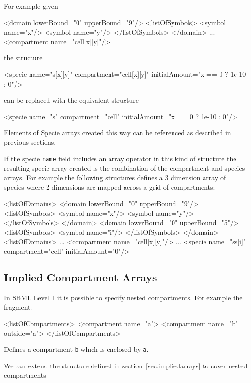 \documentclass{cekarticle}
\begin{document}
For example given
\begin{example}
<domain lowerBound="0" upperBound="9"/>
    <listOfSymbols>
        <symbol name="x"/>
        <symbol name="y"/>
    </listOfSymbols>
</domain>
...
<compartment name="cell[x][y]"/>
\end{example}
the structure
\begin{example}
<specie name="s[x][y]" compartment="cell[x][y]" initialAmount="x == 0 ? 1e-10 : 0"/>
\end{example}
can be replaced with the equivalent structure
\begin{example}
<specie name="s" compartment="cell" initialAmount="x == 0 ? 1e-10 : 0"/>
\end{example}

Elements of Specie arrays created this way can be referenced as
described in previous sections.

If the specie \texttt{name} field includes an array operator in this kind of
structure the resulting specie array created is the combination
of the compartment and species arrays.  For example the following structures defines a 3
dimension array of species where 2 dimensions are mapped across a
grid of compartments:
\begin{example}
<listOfDomains>
    <domain lowerBound="0" upperBound="9"/>
        <listOfSymbols>
            <symbol name="x"/>
            <symbol name="y"/>
        </listOfSymbols>
    </domain>
    <domain lowerBound="0" upperBound="5"/>
        <listOfSymbols>
            <symbol name="i"/>
        </listOfSymbols>
    </domain>
<listOfDomains>
...
<compartment name="cell[x][y]"/>
...
<specie name="ss[i]" compartment="cell" initialAmount="0"/>
\end{example}

\subsection{Implied Compartment Arrays}

In SBML Level 1 it is possible to specify nested compartments.
For example the fragment:

\begin{example}
<listOfCompartments>
    <compartment name="a">
    <compartment name="b" outside="a">
</listOfCompartments>
\end{example}

Defines a compartment \texttt{b} which is enclosed by \texttt{a}.

We can extend the structure defined in section~\ref{sec:impliedarrays} to cover
nested compartments.
\end{document}
